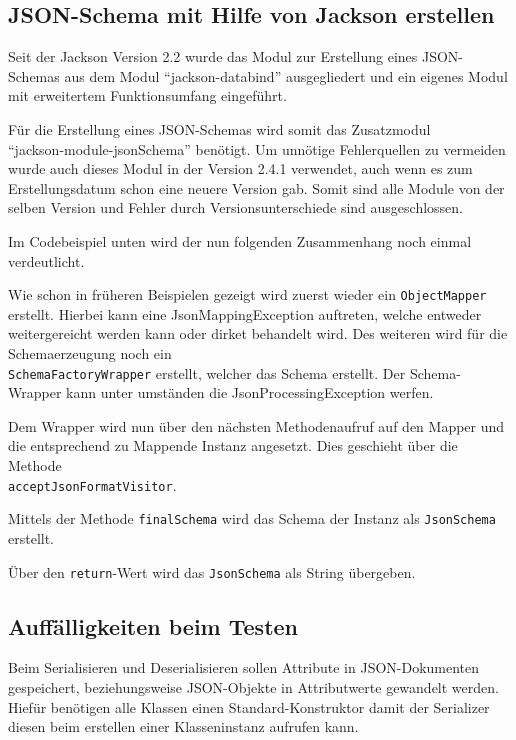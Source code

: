 

\subsection{JSON-Schema mit Hilfe von Jackson erstellen}
Seit der Jackson Version 2.2 wurde das Modul zur Erstellung eines JSON-Schemas aus dem Modul "`jackson-databind"' ausgegliedert und ein eigenes Modul mit erweitertem Funktionsumfang eingef\"uhrt. 

F\"ur die Erstellung eines JSON-Schemas wird somit das Zusatzmodul \\"`jackson-module-jsonSchema"' ben\"otigt. Um unn\"otige Fehlerquellen zu vermeiden wurde auch dieses Modul in der Version 2.4.1 verwendet, auch wenn es zum Erstellungsdatum schon eine neuere Version gab. Somit sind alle Module von der selben Version und Fehler durch Versionsunterschiede sind ausgeschlossen.

Im Codebeispiel unten wird der nun folgenden Zusammenhang noch einmal verdeutlicht.

Wie schon in fr\"uheren Beispielen gezeigt wird zuerst wieder ein \texttt{ObjectMapper} erstellt. Hierbei kann eine JsonMappingException auftreten, welche entweder weitergereicht werden kann oder dirket behandelt wird.
Des weiteren wird f\"ur die Schemaerzeugung noch ein \\\texttt{SchemaFactoryWrapper} erstellt, welcher das Schema erstellt.
Der Schema-Wrapper kann unter umst\"anden die JsonProcessingException werfen.

Dem Wrapper wird nun \"uber den n\"achsten Methodenaufruf auf den Mapper und die entsprechend zu Mappende Instanz angesetzt. Dies geschieht \"uber die Methode \\\texttt{acceptJsonFormatVisitor}.

Mittels der Methode \texttt{finalSchema} wird das Schema der Instanz als \texttt{JsonSchema} erstellt.

\"Uber den \texttt{return}-Wert wird das \texttt{JsonSchema} als String \"ubergeben.





\subsection{Auff\"alligkeiten beim Testen}
Beim Serialisieren und Deserialisieren sollen Attribute in JSON-Dokumenten gespeichert, beziehungsweise JSON-Objekte in Attributwerte gewandelt werden. Hief\"ur ben\"otigen alle Klassen einen Standard-Konstruktor damit der Serializer diesen beim erstellen einer Klasseninstanz aufrufen kann. 

